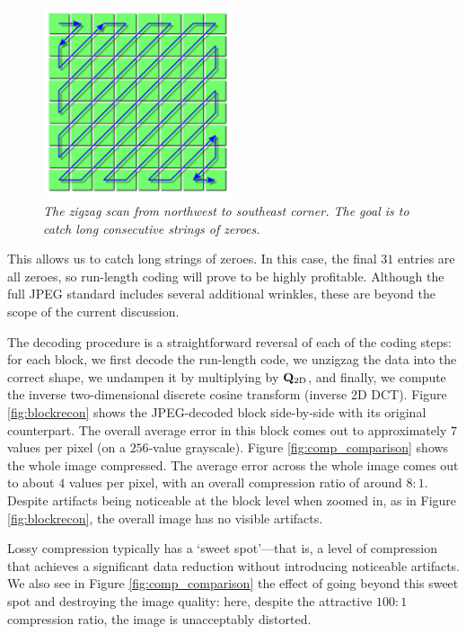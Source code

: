\begin{figure}
	\centering
	\includegraphics[width=0.5\textwidth]{chap4/figures/zigzag.png}
	\caption{\em The zigzag scan from northwest to southeast corner. The goal is to catch long consecutive strings of zeroes.}
	\label{fig:zigzag}
\end{figure}

This allows us to catch long strings of zeroes. In this case, the final $31$ entries are all zeroes, so run-length coding will prove to be highly profitable. Although the full JPEG standard includes several additional wrinkles, these are beyond the scope of the current discussion.

The decoding procedure is a straightforward reversal of each of the coding steps: for each block, we first decode the run-length code, we unzigzag the data into the correct shape, we undampen it by multiplying by $\mathbf{Q}_{\textrm{2D}}$, and finally, we compute the inverse two-dimensional discrete cosine transform (inverse 2D DCT). Figure \ref{fig:blockrecon} shows the JPEG-decoded block side-by-side with its original counterpart. The overall average error in this block comes out to approximately $7$ values per pixel (on a $256$-value grayscale). Figure \ref{fig:comp_comparison} shows the whole image compressed. The average error across the whole image comes out to about $4$ values per pixel, with an overall compression ratio of around $8 : 1$. Despite artifacts being noticeable at the block level when zoomed in, as in Figure \ref{fig:blockrecon}, the overall image has no visible artifacts. 

Lossy compression typically has a `sweet spot'---that is, a level of compression that achieves a significant data reduction without introducing noticeable artifacts. We also see in Figure \ref{fig:comp_comparison} the effect of going beyond this sweet spot and destroying the image quality: here, despite the attractive $100 : 1$ compression ratio, the image is unacceptably distorted.

